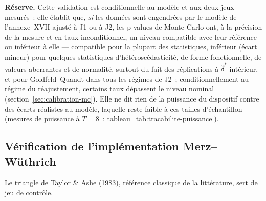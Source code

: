 \documentclass[a4paper,11pt]{article}
\begin{document}
\medskip
\begin{encadre}
\textbf{Réserve.} Cette validation est conditionnelle au modèle et aux deux jeux mesurés~: elle
établit que, \emph{si} les données sont engendrées par le modèle de l'annexe~XVII ajusté à J1 ou
à J2, les p-values de Monte-Carlo ont, à la précision de la mesure et en taux inconditionnel, un
niveau compatible avec leur référence ou inférieur à elle --- compatible pour la plupart des
statistiques, inférieur (écart mineur) pour quelques statistiques d'hétéroscédasticité, de forme
fonctionnelle, de valeurs aberrantes et de normalité, surtout du fait des réplications à
$\hat\delta^{*}$ intérieur, et pour Goldfeld--Quandt dans tous les régimes de J2~;
conditionnellement au régime du réajustement, certains taux dépassent le niveau nominal
(section~\ref{sec:calibration-mc}). Elle ne dit rien de la puissance du dispositif contre des écarts réalistes au modèle,
laquelle reste faible à ces tailles d'échantillon (mesures de puissance à $T = 8$~: tableau~\ref{tab:tracabilite-puissance}).
\end{encadre}

\newpage
\subsection{Vérification de l'implémentation Merz--Wüthrich}

Le triangle de Taylor \& Ashe (1983), référence classique de la littérature, sert
de jeu de contrôle.
\end{document}
